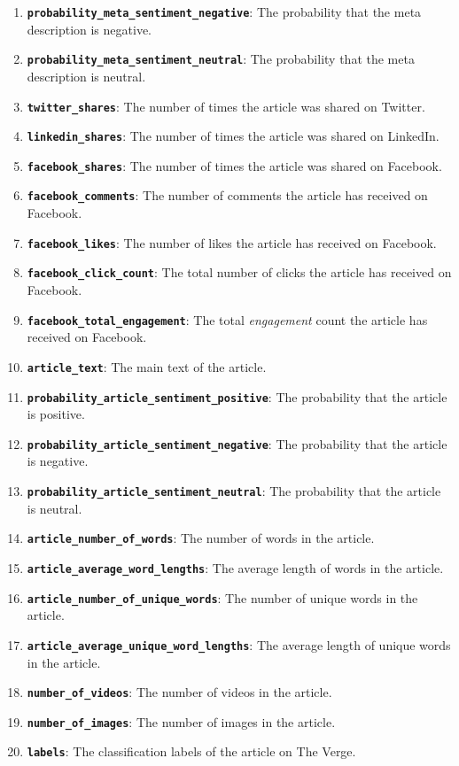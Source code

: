 \documentclass{article}
\begin{document}
\begin{enumerate}
\item \texttt{\textbf{probability\_meta\_sentiment\_negative}}: The probability that the meta description is negative.
\item \texttt{\textbf{probability\_meta\_sentiment\_neutral}}: The probability that the meta description is neutral.
\item \texttt{\textbf{twitter\_shares}}: The number of times the article was shared on Twitter.
\item \texttt{\textbf{linkedin\_shares}}: The number of times the article was shared on LinkedIn.
\item \texttt{\textbf{facebook\_shares}}: The number of times the article was shared on Facebook.
\item \texttt{\textbf{facebook\_comments}}: The number of comments the article has received on Facebook.
\item \texttt{\textbf{facebook\_likes}}: The number of likes the article has received on Facebook.
\item \texttt{\textbf{facebook\_click\_count}}: The total number of clicks the article has received on Facebook.
\item \texttt{\textbf{facebook\_total\_engagement}}: The total \emph{engagement} count the article has received on Facebook.
\item \texttt{\textbf{article\_text}}: The main text of the article.
\item \texttt{\textbf{probability\_article\_sentiment\_positive}}: The probability that the article is positive.
\item \texttt{\textbf{probability\_article\_sentiment\_negative}}: The probability that the article is negative.
\item \texttt{\textbf{probability\_article\_sentiment\_neutral}}: The probability that the article is neutral.
\item \texttt{\textbf{article\_number\_of\_words}}: The number of words in the article.
\item \texttt{\textbf{article\_average\_word\_lengths}}: The average length of words in the article.
\item \texttt{\textbf{article\_number\_of\_unique\_words}}: The number of unique words in the article.
\item \texttt{\textbf{article\_average\_unique\_word\_lengths}}: The average length of unique words in the article.
\item \texttt{\textbf{number\_of\_videos}}: The number of videos in the article.
\item \texttt{\textbf{number\_of\_images}}: The number of images in the article.
\item \texttt{\textbf{labels}}: The classification labels of the article on The Verge.
\end{enumerate}
\end{document}
